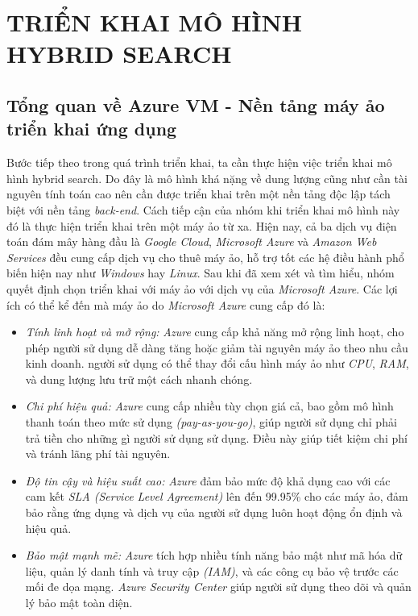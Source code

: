 \section{TRIỂN KHAI MÔ HÌNH HYBRID SEARCH}
\subsection{Tổng quan về Azure VM - Nền tảng máy ảo triển khai ứng dụng}
\hspace*{1cm}
Bước tiếp theo trong quá trình triển khai, ta cần thực hiện việc triển khai mô hình hybrid search. Do đây là mô hình khá nặng về dung lượng cũng như cần tài nguyên tính toán cao nên cần được triển khai trên một nền tảng độc lập tách biệt với nền tảng \textit{back-end}. Cách tiếp cận của nhóm khi triển khai mô hình này đó là thực hiện triển khai trên một máy ảo từ xa. Hiện nay, cả ba dịch vụ điện toán đám mây hàng đầu là \textit{Google Cloud}, \textit{Microsoft Azure} và \textit{Amazon Web Services} đều cung cấp dịch vụ cho thuê máy ảo, hỗ trợ tốt các hệ điều hành phổ biến hiện nay như \textit{Windows} hay \textit{Linux}. Sau khi đã xem xét và tìm hiểu, nhóm quyết định chọn triển khai với máy ảo với dịch vụ của \textit{Microsoft Azure}. Các lợi ích có thể kể đến mà máy ảo do \textit{Microsoft Azure} cung cấp đó là:
\begin{itemize}
    \item \textit{Tính linh hoạt và mở rộng:} \textit{Azure} cung cấp khả năng mở rộng linh hoạt, cho phép người sử dụng dễ dàng tăng hoặc giảm tài nguyên máy ảo theo nhu cầu kinh doanh. người sử dụng có thể thay đổi cấu hình máy ảo như \textit{CPU}, \textit{RAM}, và dung lượng lưu trữ một cách nhanh chóng.
    \item \textit{Chi phí hiệu quả:} \textit{Azure} cung cấp nhiều tùy chọn giá cả, bao gồm mô hình thanh toán theo mức sử dụng \textit{(pay-as-you-go)}, giúp người sử dụng chỉ phải trả tiền cho những gì người sử dụng sử dụng. Điều này giúp tiết kiệm chi phí và tránh lãng phí tài nguyên.
    \item \textit{Độ tin cậy và hiệu suất cao:} \textit{Azure} đảm bảo mức độ khả dụng cao với các cam kết \textit{SLA (Service Level Agreement)} lên đến 99.95\% cho các máy ảo, đảm bảo rằng ứng dụng và dịch vụ của người sử dụng luôn hoạt động ổn định và hiệu quả.
    \item \textit{Bảo mật mạnh mẽ:} \textit{Azure} tích hợp nhiều tính năng bảo mật như mã hóa dữ liệu, quản lý danh tính và truy cập \textit{(IAM)}, và các công cụ bảo vệ trước các mối đe dọa mạng. \textit{Azure Security Center} giúp người sử dụng theo dõi và quản lý bảo mật toàn diện.
\end{itemize}
